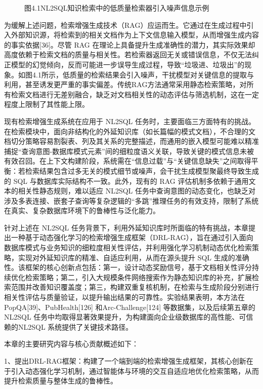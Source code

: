 \documentclass[12pt,a4paper,openright,UTF8]{ctexbook}
\begin{document}
\begin{figure}[htbp]
\centering
{}
\caption{图4.1NL2SQL知识检索中的低质量检索器引入噪声信息示例}
\end{figure}

为缓解上述问题，检索增强生成技术（RAG）应运而生。它通过在生成过程中引入外部知识源，将检索到的相关文档作为上下文信息输入模型，从而增强生成内容的事实依据[36]。尽管 RAG 在理论上具备提升生成准确性的潜力，其实际效果却高度依赖于检索文档的质量与相关性。若检索器返回无关或错误信息，不仅无法纠正模型的幻觉倾向，反而可能进一步误导生成过程，导致“垃圾进、垃圾出”的现象。如图4.1所示，低质量的检索结果会引入噪声，干扰模型对关键信息的提取与利用，甚至诱发更严重的事实偏差。传统RAG方法通常采用静态检索策略，对所有检索文档进行无差别融合，缺乏对文档相关性的动态评估与筛选机制，这在一定程度上限制了其性能上限。


现有检索增强生成系统在应用于 NL2SQL 任务时，主要面临三方面特有的挑战。在检索模块中，面向非结构化的外延知识库（如长篇幅的模式文档），不合理的文档切分策略容易割裂表、列及其关系的完整描述，而通用的嵌入模型可能难以精准捕捉“查询意图-数据库模式元素”间的细粒度语义关联，导致关键的模式信息未被有效召回。在上下文构建阶段，系统需在“信息过载”与“关键信息缺失”之间取得平衡：若检索结果包含过多无关的模式细节或噪声，会干扰生成模型聚最终导致生成的 SQL 与数据库实际结构不一致。此外，现有的 RAG 评估机制多依赖于通用文本的相关性静态规则，难以适应 NL2SQL 任务中查询意图的动态变化，也缺乏对涉及多表连接、嵌套子查询等复杂逻辑的“多跳”推理任务的有效支持，限制了系统在真实、复杂数据库环境下的鲁棒性与泛化能力。


针对上述在 NL2SQL 任务背景下，利用外延知识库时所面临的特有挑战，本章提出一种基于动态强化学习的检索增强生成框架（DRL-RAG），旨在通过引入面向数据库模式与业务知识的细粒度相关性评估，并利用强化学习机制动态优化检索策略，实现对外延知识库的精准、自适应利用，从而在源头提升 SQL 生成的准确性。该框架的核心创新点包括：第一，设计动态奖励信号，基于文档相关性评分持续优化检索策略；第二，引入大规模条件网络搜索作为静态知识库的补充，扩展检索范围并改善知识覆盖度；第三，构建双重复核机制，在检索与生成阶段分别进行相关性评估与质量验证，以提升输出结果的可靠性。实验结果表明，本方法在PopQA[39]、PubHealth[126] 和Arc-Challenge[124] 等数据集，以及后续第五章的 NL2SQL 任务中均取得显著效果提升，为构建面向企业级数据库的高性能、可信赖的NL2SQL 系统提供了关键技术路径。


本章的主要研究内容与核心贡献概述如下：


1、提出DRL-RAG框架：构建了一个端到端的检索增强生成框架，其核心创新在于引入动态强化学习机制，通过智能体与环境的交互自适应地优化检索策略，从而提升检索质量与整体生成的鲁棒性。
\end{document}
